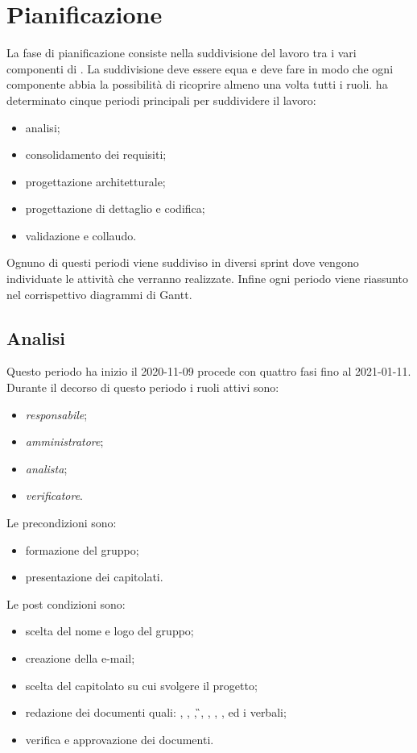 \section{Pianificazione}
La fase di pianificazione consiste nella suddivisione del lavoro tra i vari componenti di \Gruppo{}. La suddivisione deve essere equa e deve fare in modo che ogni componente abbia la possibilità di ricoprire almeno una volta tutti i ruoli.
\Gruppo{} ha determinato cinque periodi principali per suddividere il lavoro:
\begin{itemize}
\item analisi;
\item consolidamento dei requisiti;
\item progettazione architetturale;
\item progettazione di dettaglio e codifica;
\item validazione e collaudo.
\end{itemize}
Ognuno di questi periodi viene suddiviso in diversi sprint dove vengono individuate le attività che verranno realizzate.
Infine ogni periodo viene riassunto nel corrispettivo diagrammi di Gantt.
\subsection{Analisi}
Questo periodo ha inizio il 2020-11-09 procede con quattro fasi fino al 2021-01-11.
Durante il decorso di questo periodo i ruoli attivi sono:
\begin{itemize}
\item \textit{responsabile};
\item \textit{amministratore};
\item \textit{analista};
\item \textit{verificatore}.
\end{itemize}
Le precondizioni sono:
\begin{itemize}
	\item formazione del gruppo;
	\item presentazione dei capitolati.
\end{itemize}
Le post condizioni sono:
\begin{itemize}
	\item scelta del nome e logo del gruppo;
	\item creazione della e-mail;
	\item scelta del capitolato su cui svolgere il progetto;
	\item redazione dei documenti quali: \SdF{}, \NdP{}, \PdP{}, \G{}, \LdP{}, \PdQ{}, \AdR{}, ed i verbali;
	\item verifica e approvazione dei documenti.
\end{itemize}
